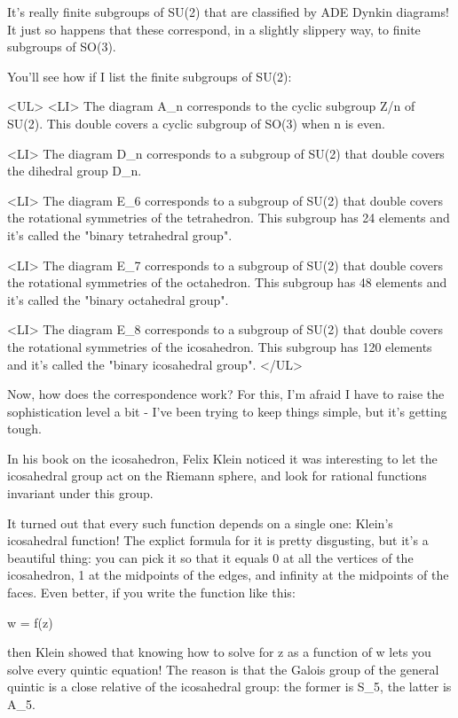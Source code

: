 It's really finite subgroups of SU(2) that are classified by ADE Dynkin 
diagrams!   It just so happens that these correspond, in a slightly
slippery way, to finite subgroups of SO(3).  

You'll see how if I list the finite subgroups of SU(2): 

<UL>
<LI>
 The diagram A_{n} corresponds to the cyclic subgroup Z/n of SU(2).
  This double covers a cyclic subgroup of SO(3) when n is even.

<LI>
 The diagram D_{n} corresponds to a subgroup of SU(2) that double 
  covers the dihedral group D_{n}.

<LI>
 The diagram E_{6} corresponds to a subgroup of SU(2) that double
  covers the rotational symmetries of the tetrahedron.  This
  subgroup has 24 elements and it's called the "binary tetrahedral group".

<LI>
 The diagram E_{7} corresponds to a subgroup of SU(2) that double
  covers the rotational symmetries of the octahedron.  This
  subgroup has 48 elements and it's called the "binary octahedral group".

<LI>
 The diagram E_{8} corresponds to a subgroup of SU(2) that double
  covers the rotational symmetries of the icosahedron.  This
  subgroup has 120 elements and it's called the "binary icosahedral group".
</UL>

Now, how does the correspondence work?  For this, I'm afraid I have to 
raise the sophistication level a bit - I've been trying to keep things
simple, but it's getting tough.  

In his book on the icosahedron, Felix Klein noticed it was interesting 
to let the icosahedral group act on the Riemann 
sphere, and look for rational functions invariant under this group.   

It turned out that every such function depends on a single one: 
Klein's icosahedral function!  The explict formula for it is pretty
disgusting, but it's a beautiful thing: you can pick it so that it 
equals 0 at all the vertices of the icosahedron, 1 at the midpoints
of the edges, and infinity at the midpoints of the faces.  Even
better, if you write the function like this:

w = f(z)

then Klein showed that knowing how to solve for z as a function of w 
lets you solve every quintic equation!  The reason is that the Galois
group of the general quintic is a close relative of the icosahedral
group: the former is S_{5}, the latter is A_{5}.

